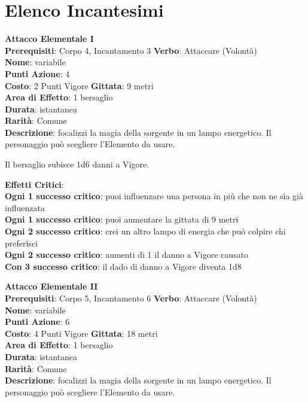 \documentclass[12pt,a4paper,twoside,openany]{book}
\begin{document}
\pagebreak

\section{Elenco Incantesimi}

\begin{multicols}{2}


\textbf{Attacco Elementale I}\\
\textbf{Prerequisiti}: Corpo 4, Incantamento 3
\textbf{Verbo}: Attaccare (Volontà)\\
\textbf{Nome}: variabile\\
\textbf{Punti Azione}: 4\\
\textbf{Costo}: 2 Punti Vigore
\textbf{Gittata}: 9 metri\\
\textbf{Area di Effetto}: 1 bersaglio\\
\textbf{Durata}: istantanea\\
\textbf{Rarità}: Comune\\
\textbf{Descrizione}: focalizzi la magia della sorgente in un lampo energetico. Il personaggio può scegliere l'Elemento da usare.

Il bersaglio subisce 1d6 danni a Vigore.


\textbf{Effetti Critici}:\\
\textbf{Ogni 1 successo critico}: puoi influenzare una persona in più che non ne sia già influenzata\\
\textbf{Ogni 1 successo critico}: puoi aumentare la gittata di 9 metri\\
\textbf{Ogni 2 successo critico}: crei un altro lampo di energia che può colpire chi preferisci\\
\textbf{Ogni 2 successo critico}: aumenti di 1 il danno a Vigore causato\\
\textbf{Con 3 successo critico}: il dado di danno a Vigore diventa 1d8

\textbf{Attacco Elementale II}\\
\textbf{Prerequisiti}: Corpo 5, Incantamento 6
\textbf{Verbo}: Attaccare (Volontà)\\
\textbf{Nome}: variabile\\
\textbf{Punti Azione}: 6\\
\textbf{Costo}: 4 Punti Vigore
\textbf{Gittata}: 18 metri\\
\textbf{Area di Effetto}: 1 bersaglio\\
\textbf{Durata}: istantanea\\
\textbf{Rarità}: Comune\\
\textbf{Descrizione}: focalizzi la magia della sorgente in un lampo energetico. Il personaggio può scegliere l'Elemento da usare.


\end{multicols}
\end{document}
